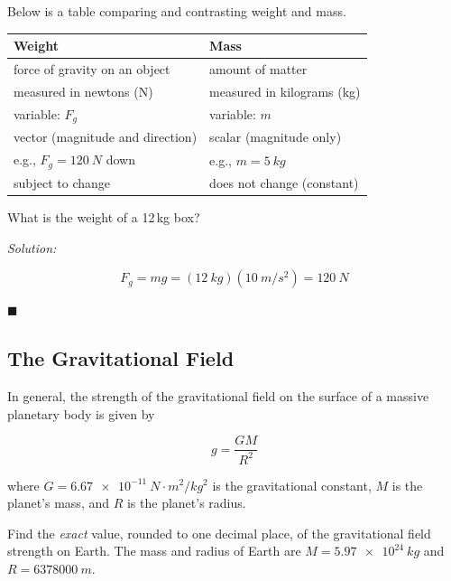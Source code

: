\documentclass[dvipsnames]{article}
\begin{document}
Below is a table comparing and contrasting weight and mass.

\begin{center}
\def\arraystretch{1.5}
    \begin{tabular}{|l|l|}
        \hline
        \textbf{Weight} & \textbf{Mass} \\ \hline
        force of gravity on an object & amount of matter \\ \hline
        measured in newtons (N) & measured in kilograms (kg) \\ \hline
        variable: $F_g$ & variable: $m$ \\ \hline
        vector (magnitude and direction) & scalar (magnitude only) \\ \hline
        e.g., $F_g = \SI{120}{N}$ down & e.g., $m = \SI{5}{kg}$ \\ \hline
        subject to change & does not change (constant) \\ \hline
    \end{tabular}
\end{center}


\begin{example}
What is the weight of a 12\,kg box?
\end{example}

\textit{Solution:}

\begin{equation*}
    F_g = mg = (\SI{12}{kg})(\SI{10}{m/s^2}) = \boxed{\SI{120}{N}}    
\end{equation*}

\hfill $\blacksquare$

\subsection{The Gravitational Field}

In general, the strength of the gravitational field on the surface of a massive planetary body is given by

\begin{equation*}
    g = \frac{GM}{R^2}
\end{equation*}

where $G = \SI{6.67e-11}{N\cdot m^2/kg^2}$ is the gravitational constant, $M$ is the planet's mass, and $R$ is the planet's radius.

\begin{example}
    Find the \textit{exact} value, rounded to one decimal place, of the gravitational field strength on Earth. The mass and radius of Earth are $M = \SI{5.97e24}{kg}$ and $R = \SI[group-separator={,}]{6378000}{m}$. 
\end{example}
\end{document}
